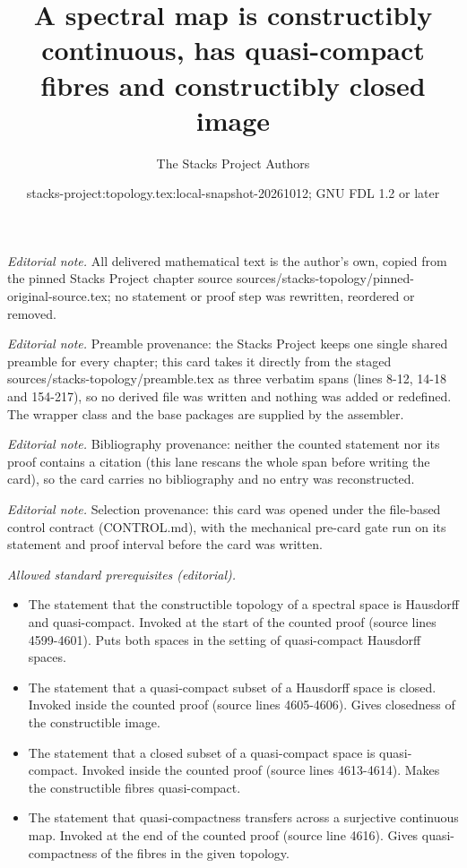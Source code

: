 \documentclass[10pt,a4paper]{amsart}
\title{A spectral map is constructibly continuous, has quasi-compact fibres and constructibly closed image}
\author{The Stacks Project Authors}
\date{stacks-project:topology.tex:local-snapshot-20261012; GNU FDL 1.2 or later}
\theoremstyle{plain}
\theoremstyle{definition}
\theoremstyle{remark}
\numberwithin{equation}{subsection}
\begin{document}
\maketitle
\noindent\textit{Editorial note.} All delivered mathematical text is the author's own, copied from the pinned Stacks Project chapter source sources/stacks-topology/pinned-original-source.tex; no statement or proof step was rewritten, reordered or removed.\par\medskip
\noindent\textit{Editorial note.} Preamble provenance: the Stacks Project keeps one single shared preamble for every chapter; this card takes it directly from the staged sources/stacks-topology/preamble.tex as three verbatim spans (lines 8-12, 14-18 and 154-217), so no derived file was written and nothing was added or redefined. The wrapper class and the base packages are supplied by the assembler.\par\medskip
\noindent\textit{Editorial note.} Bibliography provenance: neither the counted statement nor its proof contains a citation (this lane rescans the whole span before writing the card), so the card carries no bibliography and no entry was reconstructed.\par\medskip
\noindent\textit{Editorial note.} Selection provenance: this card was opened under the file-based control contract (CONTROL.md), with the mechanical pre-card gate run on its statement and proof interval before the card was written.\par\medskip
\noindent\textit{Allowed standard prerequisites (editorial).}\begin{itemize}
\item The statement that the constructible topology of a spectral space is Hausdorff and quasi-compact. Invoked at the start of the counted proof (source lines 4599-4601). Puts both spaces in the setting of quasi-compact Hausdorff spaces.
\item The statement that a quasi-compact subset of a Hausdorff space is closed. Invoked inside the counted proof (source lines 4605-4606). Gives closedness of the constructible image.
\item The statement that a closed subset of a quasi-compact space is quasi-compact. Invoked inside the counted proof (source lines 4613-4614). Makes the constructible fibres quasi-compact.
\item The statement that quasi-compactness transfers across a surjective continuous map. Invoked at the end of the counted proof (source line 4616). Gives quasi-compactness of the fibres in the given topology.
\end{itemize}\medskip
\end{document}
